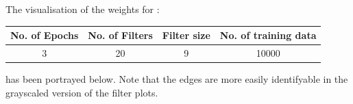 \documentclass{article} %
\begin{document}
The visualisation of the weights for :
\begin{table}[H]
  \begin{center}
    \begin{tabular}{|c|c|c|c|} %
    \hline
      \textbf{No. of Epochs} & \textbf{No. of Filters} & \textbf{Filter size} & \textbf{No. of training data}\\
      \hline
      3 & 20 & 9 & 10000 \\
      \hline
    \end{tabular}
  \end{center}
\end{table}

has been portrayed below. Note that the edges are more easily identifyable in the grayscaled version of the filter plots.
\end{document}
